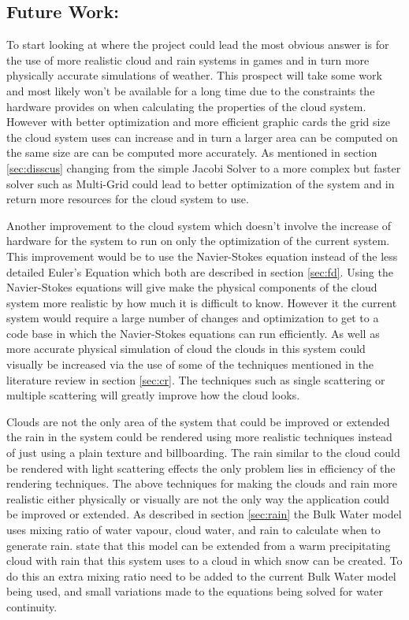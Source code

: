 \subsection{Future Work:}
\label{sec:fw}
To start looking at where the project could lead the most obvious answer is for the use of more realistic cloud and rain systems in games and in turn more physically accurate simulations of weather.
This prospect will take some work and most likely won't be available for a long time due to the constraints the hardware provides on when calculating the properties of the cloud system.
However with better optimization and more efficient graphic cards the grid size the cloud system uses can increase and in turn a larger area can be computed on the same size are can be computed more accurately.
As mentioned in section \ref{sec:disscus} changing from the simple Jacobi Solver to a more complex but faster solver such as Multi-Grid could lead to better optimization of the system and in return more resources for the cloud system to use.

Another improvement to the cloud system which doesn't involve the increase of hardware for the system to run on only the optimization of the current system.
This improvement would be to use the Navier-Stokes equation instead of the less detailed Euler's Equation which both are described in section \ref{sec:fd}.
Using the Navier-Stokes equations will give make the physical components of the cloud system more realistic by how much it is difficult to know.
However it the current system would require a large number of changes and optimization to get to a code base in which the Navier-Stokes equations can run efficiently. 
As well as more accurate physical simulation of cloud the clouds in this system could visually be increased via the use of some of the techniques mentioned in the literature review in section \ref{sec:cr}.
The techniques such as single scattering or multiple scattering will greatly improve how the cloud looks. 

Clouds are not the only area of the system that could be improved or extended the rain in the system could be rendered using more realistic techniques instead of just using a plain texture and billboarding.
The rain similar to the cloud could be rendered with light scattering effects the only problem lies in efficiency of the rendering techniques. 
The above techniques for making the clouds and rain more realistic either physically or visually are not the only way the application could be improved or extended.
As described in section \ref{sec:rain} the Bulk Water model uses mixing ratio of water vapour, cloud water, and rain to calculate when to generate rain.
\cite{houze1994cloud} state that this model can be extended from a warm precipitating cloud with rain that this system uses to a cloud in which snow can be created.
To do this an extra mixing ratio need to be added to the current Bulk Water model being used, and small variations made to the equations being solved for water continuity.

